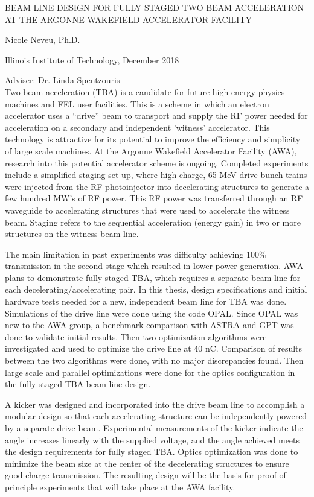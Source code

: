 \documentclass{article}
\begin{document}
\noindent\uppercase{Beam Line Design for Fully Staged Two Beam Acceleration at the Argonne Wakefield Accelerator Facility}


\noindent Nicole Neveu, Ph.D.

\noindent Illinois Institute of Technology, December 2018 

\noindent Adviser: Dr. Linda Spentzouris \\



	Two beam acceleration (TBA) is a candidate for future high energy physics machines and FEL user facilities. 
	This is a scheme in which an electron accelerator uses a ``drive'' beam to transport and supply the RF power needed for acceleration
	on a secondary and independent 'witness' accelerator. This technology is attractive for its potential to 
	improve the efficiency and simplicity of large scale machines. At the Argonne Wakefield Accelerator Facility (AWA), 
	research into this potential accelerator scheme is ongoing. Completed experiments include a simplified staging set up, 
	where high-charge, 65 MeV drive bunch trains were injected from the RF photoinjector into decelerating 
	structures to generate a few hundred MW's of RF power. This RF power was transferred through an 
	RF waveguide to accelerating structures that were used to accelerate the witness beam. 
	Staging refers to the sequential acceleration (energy gain) in two or more structures on the witness beam line. 
	
	The main limitation in past experiments was difficulty achieving 100\% transmission in the 
	second stage which resulted in lower power generation. 
	AWA plans to demonstrate fully staged TBA, which requires a separate beam line for each decelerating/accelerating pair.
	In this thesis, design specifications and initial hardware tests  needed for a new, independent beam line for TBA was done. 
	Simulations of the drive line were done using the code OPAL.
	Since OPAL was new to the AWA group, a benchmark comparison with ASTRA and GPT was done to validate initial results. 
	Then two optimization algorithms were investigated and used to optimize the drive line at 40 nC.
	Comparison of results between the two algorithms were done, with no major discrepancies found.
	Then large scale and parallel optimizations were done for the optics configuration in the fully staged TBA beam line design.  
	
	A kicker was designed and incorporated into the drive beam line to accomplish a modular design so that 
	each accelerating structure can be independently powered by a separate drive beam. 
	Experimental measurements of the kicker indicate the angle increases linearly with the supplied voltage, 
	and the angle achieved meets the design requirements for fully staged TBA. 
	Optics optimization was done to minimize the beam size at the center of the 
	decelerating structures to ensure good charge transmission. 
	The resulting design will be the basis for proof of principle experiments that will take place at the AWA facility. 
\end{document}
